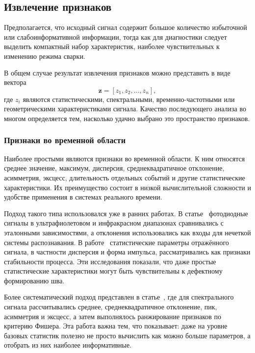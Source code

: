 \subsection{Извлечение признаков}

Предполагается, что исходный сигнал содержит большое количество избыточной или слабоинформативной информации, тогда как для диагностики следует выделить компактный набор характеристик, наиболее чувствительных к изменению режима сварки.

В общем случае результат извлечения признаков можно представить в виде вектора
\[
\mathbf{z} = [z_1, z_2, \dots, z_n],
\]
где \(z_i\) являются статистическими, спектральными, временно-частотными или геометрическими характеристиками сигнала. Качество последующего анализа во многом определяется тем, насколько удачно выбрано это пространство признаков.

\subsubsection{Признаки во временной области}

Наиболее простыми являются признаки во временной области. К ним относятся среднее значение, максимум, дисперсия, среднеквадратичное отклонение, асимметрия, эксцесс, длительность отдельных событий и другие статистические характеристики. Их преимущество состоит в низкой вычислительной сложности и удобстве применения в системах реального времени.

Подход такого типа использовался уже в ранних работах. В статье~\cite{park2001fuzzy} фотодиодные сигналы в ультрафиолетовом и инфракрасном диапазонах сравнивались с эталонными зависимостями, а отклонения использовались как входы для нечеткой системы распознавания. В работе~\cite{olsson2011advances} статистические параметры отражённого сигнала, в частности дисперсия и форма импульса, рассматривались как признаки стабильности процесса. Эти исследования показали, что даже простые статистические характеристики могут быть чувствительны к дефектному формированию шва.

Более систематический подход представлен в статье~\cite{LEE2020307}, где для спектрального сигнала рассчитывались среднее, среднеквадратичное отклонение, пик, асимметрия и эксцесс, а затем выполнялось ранжирование признаков по критерию Фишера. Эта работа важна тем, что показывает: даже на уровне базовых статистик полезно не просто вычислить как можно больше параметров, а отобрать из них наиболее информативные.

